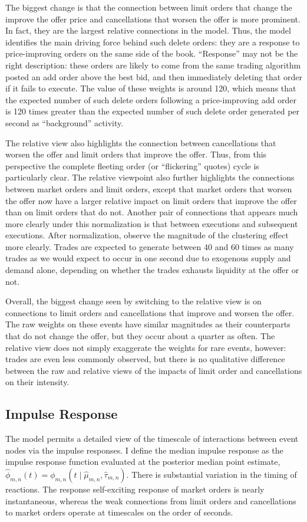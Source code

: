 		The biggest change is that the connection between limit orders that change the improve the offer price and cancellations that worsen the offer is more prominent. In fact, they are the largest relative connections in the model. Thus, the model identifies the main driving force behind such delete orders: they are a response to price-improving orders on the same side of the book. “Response” may not be the right description: these orders are likely to come from the same trading algorithm posted an add order above the best bid, and then immediately deleting that order if it fails to execute. The value of these weights is around 120, which means that the expected number of such delete orders following a price-improving add order is 120 times greater than the expected number of such delete order generated per second as “background” activity.

		The relative view also highlights the connection between cancellations that worsen the offer and limit orders that improve the offer. Thus, from this perspective the complete fleeting order (or ``flickering'' quotes) cycle is particularly clear. The relative viewpoint also further highlights the connections between market orders and limit orders, except that market orders that worsen the offer now have a larger relative impact on limit orders that improve the offer than on limit orders that do not. Another pair of connections that appears much more clearly under this normalization is that between executions and subsequent executions. After normalization, observe the magnitude of the clustering effect more clearly. Trades are expected to generate between 40 and 60 times as many trades as we would expect to occur in one second due to exogenous supply and demand alone, depending on whether the trades exhausts liquidity at the offer or not.

		Overall, the biggest change seen by switching to the relative view is on connections to limit orders and cancellations that improve and worsen the offer. The raw weights on these events have similar magnitudes as their counterparts that do not change the offer, but they occur about a quarter as often. The relative view does not simply exaggerate the weights for rare events, however: trades are even less commonly observed, but there is no qualitative difference between the raw and relative views of the impacts of limit order and cancellations on their intensity.

	\subsection{Impulse Response}
		The model permits a detailed view of the timescale of interactions between event nodes via the impulse responses. I define the median impulse response as the impulse response function evaluated at the posterior median point estimate, $\hat{\phi}_{m,n}(t) = \phi_{m,n} \left( t \mid \hat{\mu}_{m,n}, \hat{\tau}_{m,n} \right)$. There is substantial variation in the timing of reactions. The response self-exciting response of market orders is nearly instantaneous, whereas the weak connections from limit orders and cancellations to market orders operate at timescales on the order of seconds.

